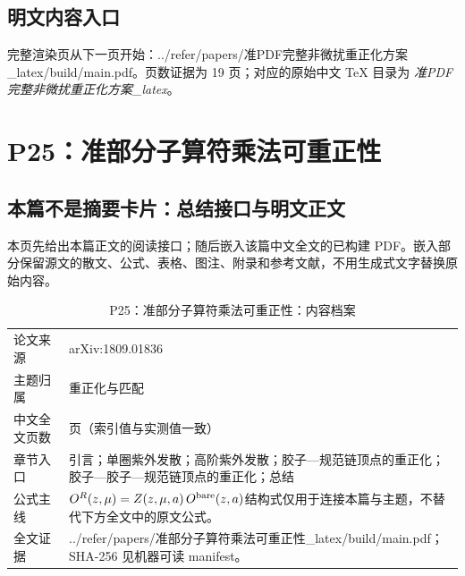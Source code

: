 \documentclass[UTF8,11pt,oneside]{ctexbook}
\begin{document}
\section*{明文内容入口}
\noindent 完整渲染页从下一页开始：../\allowbreak{}refer/\allowbreak{}papers/\allowbreak{}准PDF完整非微扰重正化方案\_\allowbreak{}latex/\allowbreak{}build/\allowbreak{}main.pdf。页数证据为 19 页；对应的原始中文 TeX 目录为 \emph{准PDF完整非微扰重正化方案\_latex}。
\clearpage

\clearpage

\chapter{P25：准部分子算符乘法可重正性}
\section*{本篇不是摘要卡片：总结接口与明文正文}
本页先给出本篇正文的阅读接口；随后嵌入该篇中文全文的已构建 PDF。嵌入部分保留源文的散文、公式、表格、图注、附录和参考文献，不用生成式文字替换原始内容。
\begin{table}[htbp]
  \centering
  \caption{P25：准部分子算符乘法可重正性：内容档案}
  \small
  \begin{tabularx}{0.96\textwidth}{@{}p{3.3cm}>{\raggedright\arraybackslash}X@{}}
    \toprule
    论文来源 & arXiv:1809.01836 \\
    主题归属 & 重正化与匹配 \\
    中文全文页数 & 9 页（索引值与实测值一致） \\
    章节入口 & 引言；单圈紫外发散；高阶紫外发散；胶子—规范链顶点的重正化；胶子—胶子—规范链顶点的重正化；总结 \\
    公式主线 & $O^{R}(z,\mu)=Z(z,\mu,a)\,O^{\rm bare}(z,a)$\newline\scriptsize 结构式仅用于连接本篇与主题，不替代下方全文中的原文公式。 \\
    全文证据 & ../\allowbreak{}refer/\allowbreak{}papers/\allowbreak{}准部分子算符乘法可重正性\_\allowbreak{}latex/\allowbreak{}build/\allowbreak{}main.pdf；SHA-256 见机器可读 manifest。 \\
    \bottomrule
  \end{tabularx}
\end{table}
\end{document}
